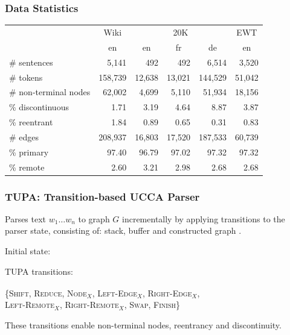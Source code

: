\documentclass[t,xcolor={svgnames,table}]{beamer}
\newcommand{\parser}[1]{TUPA\textsubscript{#1}}
\begin{document}
\begin{frame}
\frametitle{Data Statistics}
\centering
\def\arraystretch{1.5}
\begin{tabular}{l|r|rrr|r}
    & \multicolumn{1}{c|}{Wiki} & \multicolumn{3}{c|}{20K} & \multicolumn{1}{c}{EWT} \\
    & \multicolumn{1}{c|}{en} & \multicolumn{1}{c}{en} & \multicolumn{1}{c}{fr} & \multicolumn{1}{c|}{de} & \multicolumn{1}{c}{en} \\
    \hline
    \# sentences&5,141&492&492&6,514&3,520 \\
    \# tokens&158,739&12,638&13,021&144,529&51,042 \\
    \hline
    \# {\color{blue} non-terminal nodes}&62,002&4,699&5,110&51,934&18,156 \\
    \% {\color{red}discontinuous}&1.71&3.19&4.64&8.87&3.87 \\
    \% {\color{orange}reentrant}&1.84&0.89&0.65&0.31&0.83 \\
    \hline
    \# edges&208,937&16,803&17,520&187,533&60,739 \\
    \% primary&97.40&96.79&97.02&97.32&97.32 \\
    \% remote&2.60&3.21&2.98&2.68&2.68
\end{tabular}
\end{frame}


\begin{frame}
\frametitle{TUPA: Transition-based UCCA Parser}

Parses text $w_1 \ldots w_n$ to graph $G$ incrementally by applying transitions to the parser state,
consisting of: stack, buffer and constructed graph \citep*{hershcovich2017a}.

\pause
\vfill
Initial state:

\vfill
\pause
\parser{} transitions:

\{\textsc{Shift, Reduce, {\color{blue}Node$_X$}, Left-Edge$_X$, Right-Edge$_X$,}\\
\hspace{5mm}\textsc{{\color{orange}Left-Remote$_X$}, {\color{orange}Right-Remote$_X$}, {\color{red}Swap}, Finish}\}

\vfill
These transitions enable {\color{blue}non-terminal nodes}, {\color{orange}reentrancy} and {\color{red}discontinuity}.
\end{frame}
\end{document}
